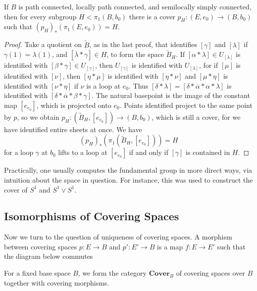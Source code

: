 \begin{theorem}
    If $B$ is path connected, locally path connected, and semilocally simply connected, then for every subgroup $H < \pi_1(B,b_0)$ there is a cover $p_H: (E,e_0) \to (B,b_0)$ such that $(p_H)_*(\pi_1(E,e_0)) = H$.
\end{theorem}
\begin{proof}
    Take a quotient on $\tilde{B}$, as in the last proof, that identifies $[\gamma]$ and $[\lambda]$ if $\gamma(1) = \lambda(1)$, and $[\overline{\lambda} * \gamma] \in H$, to form the space $\tilde{B}_H$. If $[\alpha * \lambda] \in U_{[\lambda]}$ is identified with $[\beta * \gamma] \in U_{[\gamma]}$, then $U_{[\gamma]}$ is identified with $U_{[\lambda]}$, for if $[\mu]$ is identified with $[\nu]$, then $[\eta * \mu]$ is identified with $[\eta * \nu]$ and $[\mu * \eta]$ is identified with $[\nu * \eta]$ if $\nu$ is a loop at $e_0$. Thus $[\delta * \lambda] = [\delta * \overline{\alpha} * \alpha * \lambda]$ is identified with $[\delta * \overline{\alpha} * \beta * \gamma]$. The natural basepoint is the image of the constant map $[e_{e_0}]$, which is projected onto $e_0$. Points identified project to the same point by $p$, so we obtain $p_H: (\tilde{B}_H, [e_{e_0}]) \to (B,b_0)$, which is still a cover, for we have identified entire sheets at once. We have
    \[ (p_H)_*(\pi_1(\tilde{B}_H, [e_{e_0}])) = H \]
    for a loop $\gamma$ at $b_0$ lifts to a loop at $[e_{e_0}]$ if and only if $[\gamma]$ is contained in $H$.
\end{proof}

Practically, one usually computes the fundamental group in more direct ways, via intuition about the space in question. For instance, this was used to construct the cover of $S^1$ and $S^1 \vee S^1$.

\subsection{Isomorphisms of Covering Spaces}

Now we turn to the question of uniqueness of covering spaces. A morphism between covering spaces $p: E \to B$ and $p' : E' \to B$ is a map $f: E \to E'$ such that the diagram below commutes
%
\begin{center}
\end{center}
%
For a fixed base space $B$, we form the category $\textbf{Cover}_B$ of covering spaces over $B$ together with covering morphisms.


